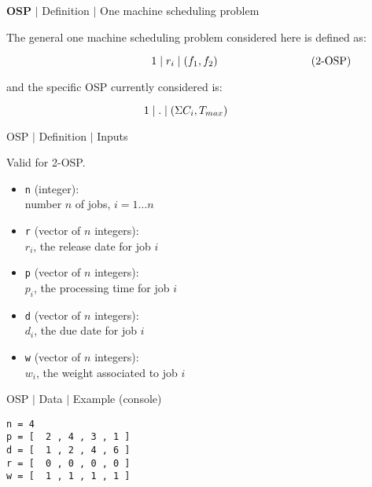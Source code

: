 %
% 

\begin{frame}{\textbf{OSP} $\mid$ Definition $\mid$ One machine scheduling problem}

The general one machine scheduling problem considered here is defined as:

$$ \hspace{30mm} 1\mid r_i \mid (f_1,f_2)  \hspace{30mm} \mbox{(2-OSP)}$$
\medskip 

and the specific OSP  currently considered is:

$$1\mid . \mid (\Sigma C_i,T_{max}) \hspace{12mm}$$

\end{frame}

%
% 
\begin{frame}{OSP $\mid$ Definition $\mid$ Inputs}

Valid for 2-OSP.
\bigskip
              \begin{itemize}
                \item \texttt{n} (integer): \\ number $n$ of jobs, $i=1\dots n$   
                                           \medskip
                \item \texttt{r} (vector of $n$  integers): \\   $r_{i}$,  the release date for job $i$                
                                           \medskip    
                \item \texttt{p} (vector of $n$  integers): \\   $p_{i}$, the processing time for job $i$         
                                           \medskip    
                \item \texttt{d} (vector of $n$  integers): \\  $d_{i}$, the due date for job $i$     
                                           \medskip
                \item \texttt{w} (vector of $n$  integers): \\  $w_{i}$, the weight associated to job $i$                              
              \end{itemize}
\end{frame}

%
% 
\begin{frame}[fragile=singleslide]{OSP $\mid$ Data $\mid$ Example (console)}

{\small
\begin{verbatim}
n = 4
p = [  2 , 4 , 3 , 1 ]
d = [  1 , 2 , 4 , 6 ]
r = [  0 , 0 , 0 , 0 ]
w = [  1 , 1 , 1 , 1 ]
\end{verbatim}
}

\end{frame}


